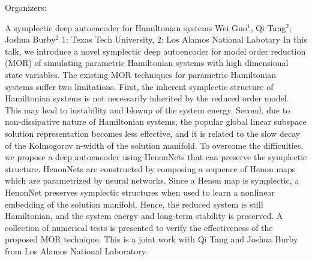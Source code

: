 \label{mini20}

\miniabs
{}
{Organizers: }
{}

\vspace{2ex}
\abs
{A symplectic deep autoencoder for Hamiltonian systems}
{Wei Guo$^{1}$, Qi Tang$^{2}$, Joshua Burby$^{2}$}
{1: Texas Tech University, 2: Los Alamos National Labotary}
{In this talk, we introduce a novel symplectic deep autoencoder for model order reduction (MOR) of simulating parametric Hamiltonian systems with high dimensional state variables. The existing MOR techniques for parametric Hamiltonian systems suffer two limitations. First, the inherent symplectic structure of Hamiltonian systems is not necessarily inherited by the reduced order model. This may lead to instability and blowup of the system energy. Second, due to non-dissipative nature of Hamiltonian systems, the popular global linear subspace solution representation becomes less effective, and it is related to the slow decay of the Kolmogorov n-width of the solution manifold. To overcome the difficulties, we propose a deep autoencoder using HenonNets that can preserve the symplectic structure. HenonNets are constructed by composing a sequence of Henon maps which are parametrized by neural networks. Since a Henon map is symplectic, a HenonNet preserves symplectic structures when used to learn a nonlinear embedding of the solution manifold. Hence, the reduced system is still Hamiltonian, and the system energy and long-term stability is preserved. A collection of numerical tests is presented to verify the effectiveness of the proposed MOR technique. This is a joint work with Qi Tang and Joshua Burby from Los Alamos National Laboratory.}


